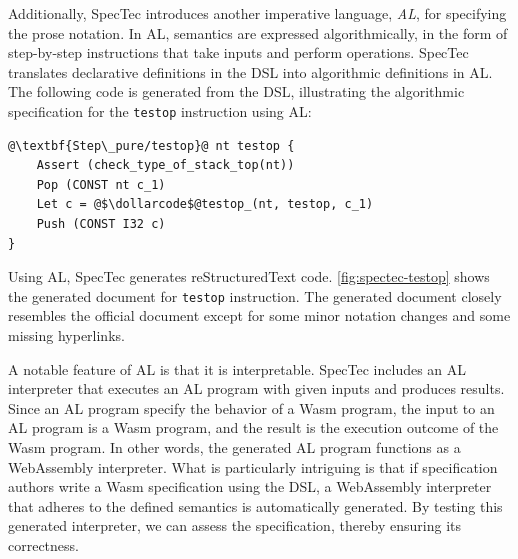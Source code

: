 Additionally, SpecTec introduces another imperative language, \textit{AL}, for
specifying the prose notation.
In AL, semantics are expressed algorithmically, in the form of step-by-step
instructions that take inputs and perform operations.
SpecTec translates declarative definitions in the DSL into algorithmic
definitions in AL.
The following code is generated from the DSL, illustrating the algorithmic
specification for the \texttt{testop} instruction using AL:
\begin{lstlisting}[style=al]
@\textbf{Step\_pure/testop}@ nt testop {
    Assert (check_type_of_stack_top(nt))
    Pop (CONST nt c_1)
    Let c = @$\dollarcode$@testop_(nt, testop, c_1)
    Push (CONST I32 c)
}
\end{lstlisting}
Using AL, SpecTec generates reStructuredText code.
\cref{fig:spectec-testop} shows the generated document for \texttt{testop}
instruction.
The generated document closely resembles the official document except for some
minor notation changes and some missing hyperlinks.


A notable feature of AL is that it is interpretable.
SpecTec includes an AL interpreter that executes an AL program with given inputs
and produces results.
Since an AL program specify the behavior of a Wasm program, the input to an AL
program is a Wasm program, and the result is the execution outcome of the Wasm
program.
In other words, the generated AL program functions as a WebAssembly interpreter.
What is particularly intriguing is that if specification authors write a Wasm
specification using the DSL, a WebAssembly interpreter that adheres to the
defined semantics is automatically generated.
By testing this generated interpreter, we can assess the specification,
thereby ensuring its correctness.
